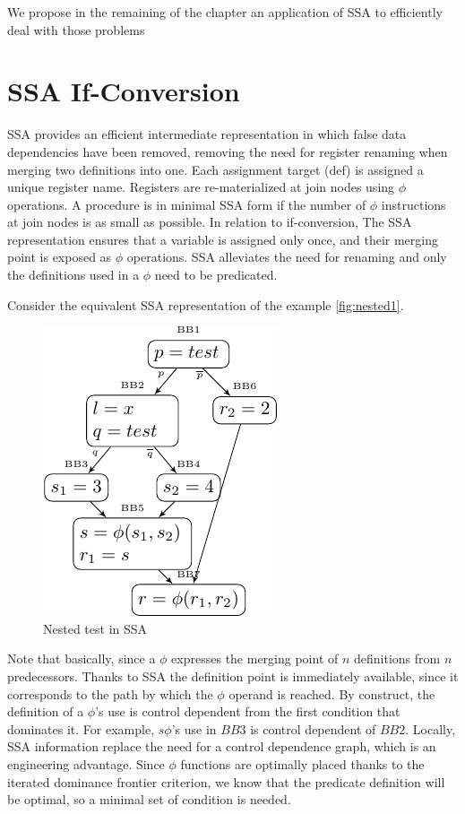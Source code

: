 We propose in the remaining of the chapter an application of SSA to efficiently deal with those problems

\section{SSA If-Conversion}

SSA provides an efficient intermediate representation in which false data dependencies have been removed, removing the need for register renaming when merging two definitions into one. Each assignment target (def) is assigned a unique register name. Registers are re-materialized at join nodes using $\phi$ operations. A procedure is in minimal SSA form if the number of $\phi$ instructions at join nodes is as small as possible. In relation to if-conversion, The SSA representation ensures that a variable is assigned only once, and their merging point is exposed as $\phi$ operations. SSA alleviates the need for renaming and only the definitions used in a $\phi$ need to be predicated. 

Consider the equivalent SSA representation of the example \ref{fig:nested1}.

\begin{figure}
\centering
\includegraphics[scale=0.8]{nested4}
\caption{Nested test in SSA}
\label{fig:nest_ssa}
\end{figure}

Note that basically, since a $\phi$ expresses the merging point of $n$ definitions from $n$ predecessors. Thanks to SSA the definition point is immediately available, since it corresponds to the path by which the $\phi$ operand is reached. By construct, the definition of a $\phi$'s use is control dependent from the first condition that dominates it. For example, $s \phi$'s use in $BB3$ is control dependent of $BB2$. Locally, SSA information replace the need for a control dependence graph, which is an engineering advantage. Since $\phi$ functions are optimally placed thanks to the iterated dominance frontier criterion, we know that the predicate definition will be optimal, so a minimal set of condition is needed.

